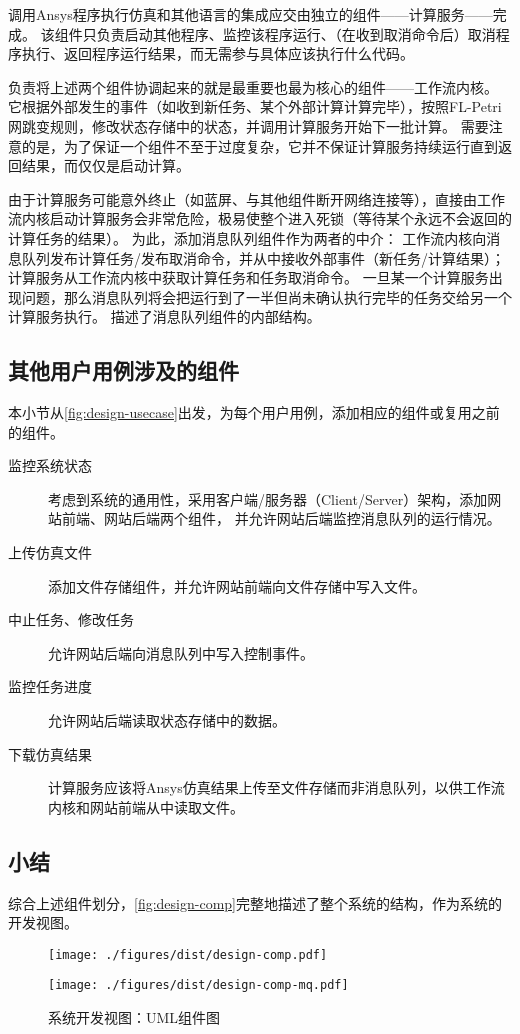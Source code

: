\documentclass[index]{subfiles}
\begin{document}
调用Ansys程序执行仿真和其他语言的集成应交由独立的组件——计算服务——完成。
该组件只负责启动其他程序、监控该程序运行、（在收到取消命令后）取消程序执行、返回程序运行结果，而无需参与具体应该执行什么代码。

负责将上述两个组件协调起来的就是最重要也最为核心的组件——工作流内核。
它根据外部发生的事件（如收到新任务、某个外部计算计算完毕），按照FL-Petri网跳变规则，修改状态存储中的状态，并调用计算服务开始下一批计算。
需要注意的是，为了保证一个组件不至于过度复杂，它并不保证计算服务持续运行直到返回结果，而仅仅是启动计算。

由于计算服务可能意外终止（如蓝屏、与其他组件断开网络连接等），直接由工作流内核启动计算服务会非常危险，极易使整个进入死锁（等待某个永远不会返回的计算任务的结果）。
为此，添加消息队列组件作为两者的中介：
工作流内核向消息队列发布计算任务/发布取消命令，并从中接收外部事件（新任务/计算结果）；
计算服务从工作流内核中获取计算任务和任务取消命令。
一旦某一个计算服务出现问题，那么消息队列将会把运行到了一半但尚未确认执行完毕的任务交给另一个计算服务执行。
描述了消息队列组件的内部结构。

\subsection{其他用户用例涉及的组件}
本小节从\cref{fig:design-usecase}出发，为每个用户用例，添加相应的组件或复用之前的组件。
\begin{description}
  \item[监控系统状态] 考虑到系统的通用性，采用客户端/服务器（Client/Server）架构，添加网站前端、网站后端两个组件，
    并允许网站后端监控消息队列的运行情况。
  \item[上传仿真文件] 添加文件存储组件，并允许网站前端向文件存储中写入文件。
  \item[中止任务、修改任务] 允许网站后端向消息队列中写入控制事件。
  \item[监控任务进度] 允许网站后端读取状态存储中的数据。
  \item[下载仿真结果] 计算服务应该将Ansys仿真结果上传至文件存储而非消息队列，以供工作流内核和网站前端从中读取文件。
\end{description}

\subsection{小结}
综合上述组件划分，\cref{fig:design-comp}完整地描述了整个系统的结构，作为系统的开发视图。
\begin{figure}[h]
  \centering%
    {\texttt{[image: ./figures/dist/design-comp.pdf]}}\par
    {\texttt{[image: ./figures/dist/design-comp-mq.pdf]}}
  \caption{系统开发视图：UML组件图}
\end{figure}
\end{document}
